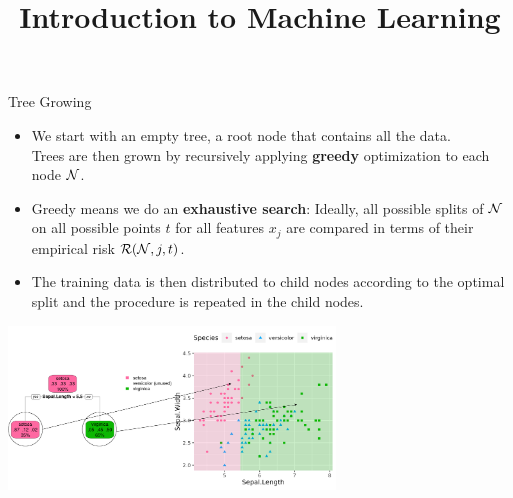 \documentclass[11pt,compress,t,notes=noshow, xcolor=table]{beamer}
\title{Introduction to Machine Learning}
\institute{\href{https://compstat-lmu.github.io/lecture_i2ml/}{compstat-lmu.github.io/lecture\_i2ml}}
\date{}
\begin{document}
\sloppy

\begin{vbframe}{Tree Growing}

\begin{itemize}

\item We start with an empty tree, a root node that contains all the data.\\
Trees are then grown by recursively applying \textbf{greedy} optimization to each node $\mathcal{N}$.

\item Greedy means we do an \textbf{exhaustive search}: Ideally, all possible splits of $\mathcal{N}$ on all possible points $t$ for all features $x_j$ are compared in terms of their empirical risk $\mathcal{R}(\mathcal{N}, j, t)$. 

\item The training data is then distributed to child nodes according to the optimal split and the procedure is repeated in the child nodes.

\end{itemize}

\color{fgcolor}

{\centering \includegraphics[width=0.65\textwidth]{figure/tree-classif-depth1-ann.pdf} 

}

\end{vbframe}
\end{document}
